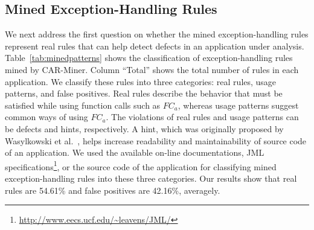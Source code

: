 \subsection{Mined Exception-Handling Rules}
\label{sec:minedrules}

We next address the first question on whether the mined exception-handling rules represent real rules
that can help detect defects in an application under analysis. Table~\ref{tab:minedpatterns} 
shows the classification of exception-handling rules mined by CAR-Miner. Column 
``Total'' shows the total number of rules in each application. 
We classify these rules into three categories: real rules, usage patterns, and false
positives. Real rules describe the behavior that must be satisfied while using function calls
such as $FC_a$, whereas usage patterns suggest common ways of using $FC_a$. The violations of real rules and usage patterns
can be defects and hints, respectively. A hint, which was originally
proposed by Wasylkowski et al.~\cite{wasylkowski07:detecting}, helps increase
readability and maintainability of source code of an application. 
We used the available on-line documentations, JML
specifications\footnote{\url{http://www.eecs.ucf.edu/~leavens/JML/}}, 
or the source code of the application for classifying mined exception-handling rules
into these three categories. Our results show that real rules are  
54.61\% and false positives are 42.16\%, averagely. 

